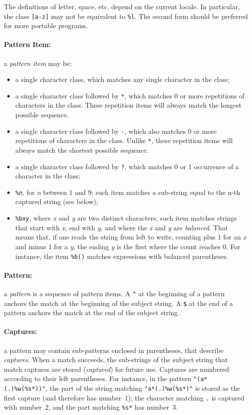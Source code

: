 \documentclass[11pt]{article}
\newcommand{\M}[1]{\emph{#1}}
\newcommand{\T}[1]{{\tt #1}}
\newcommand{\Def}[1]{\emph{#1}\index{#1}}
\begin{document}
The definitions of letter, space, etc. depend on the current locale.
In particular, the class \verb|[a-z]| may not be equivalent to \verb|%l|.
The second form should be preferred for more portable programs.

\paragraph{Pattern Item:}
a \Def{pattern item} may be:
\begin{itemize}
\item
a single character class,
which matches any single character in the class;
\item
a single character class followed by \verb|*|,
which matches 0 or more repetitions of characters in the class.
These repetition items will always match the longest possible sequence.
\item
a single character class followed by \verb|-|,
which also matches 0 or more repetitions of characters in the class.
Unlike \verb|*|,
these repetition items will always match the shortest possible sequence.
\item
a single character class followed by \verb|?|,
which matches 0 or 1 occurrence of a character in the class;
\item
\T{\%\M{n}}, for \M{n} between 1 and 9;
such item matches a sub-string equal to the n-th captured string
(see below);
\item
\T{\%b\M{xy}}, where \M{x} and \M{y} are two distinct characters;
such item matches strings that start with \M{x}, end with \M{y},
and where the \M{x} and \M{y} are \emph{balanced}.
That means that, if one reads the string from left to write,
counting plus 1 for an \M{x} and minus 1 for a \M{y},
the ending \M{y} is the first where the count reaches 0.
For instance, the item \verb|%b()| matches expressions with
balanced parentheses.
\end{itemize}

\paragraph{Pattern:}
a \Def{pattern} is a sequence of pattern items.
A \verb|^| at the beginning of a pattern anchors the match at the
beginning of the subject string.
A \verb|$| at the end of a pattern anchors the match at the
end of the subject string.

\paragraph{Captures:}
a pattern may contain sub-patterns enclosed in parentheses,
that describe \Def{captures}.
When a match succeeds, the sub-strings of the subject string
that match captures are stored (\emph{captured}) for future use.
Captures are numbered according to their left parentheses.
For instance, in the pattern \verb|"(a*(.)%w(%s*))"|,
the part of the string matching \verb|"a*(.)%w(%s*)"| is
stored as the first capture (and therefore has number~1);
the character matching \verb|.| is captured with number~2,
and the part matching \verb|%s*| has number~3.
\end{document}
